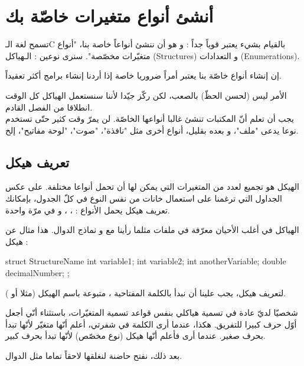 \chapter{أنشئ أنواع متغيرات خاصّة بك}

تسمح لغة الـ\textenglish{C}
بالقيام بشيء يعتبر قوياً جداً : و هو أن ننشئ أنواعاً خاصة بنا، "أنواع متغيّرات مخصّصة". سنرى نوعين : الـهياكل
(\textenglish{Structures})
و التعدادات
(\textenglish{Enumerations}).

 إن إنشاء أنواع خاصّة بنا يعتبر أمراً ضروريا خاصة إذا أردنا إنشاء برامج أكثر تعقيداً.

الأمر ليس  (لحسن الحظّ) بالصعب، لكن ركّز جيّدا لأننا سنستعمل الهياكل كل الوقت انطلاقا من الفصل القادم.\\
يجب أن تعلم أنّ المكتبات تنشئ غالبا أنواعها الخاصّة. لن يمرّ وقت كثير حتّى تستخدم نوعا يدعى "ملف"، و بعده بقليل، أنواع أخرى مثل "نافذة"، "صوت"، "لوحة مفاتيح"، إلخ.

\section{تعريف هيكل}

الهيكل هو تجميع لعدد من المتغيرات التي يمكن لها أن تحمل أنواعا مختلفة. على عكس الجداول التي ترغمنا على استعمال خانات من نفس النوع في كلّ الجدول، بإمكانك تعريف هيكل يحمل الأنواع :
، ، 
و
في مرّة واحدة.

الهياكل في أغلب الأحيان معرّفة في ملفات
مثلما رأينا مع
و نماذج الدوال. هذا مثال عن هيكل :

\begin{Csource}
struct StructureName
{
	int variable1;
	int variable2;
	int anotherVariable;
	double decimalNumber;
};
\end{Csource}

لتعريف هيكل، يجب علينا أن نبدأ بالكلمة المفتاحية
،
متبوعة باسم الهيكل (مثلا
أو
).

\begin{information}
  شخصيّا لديّ عادة في تسمية هياكلي بنفس قواعد تسمية المتغيّرات، باستثناء أنّي أجعل أوّل حرف كبيرا للتفريق. هكذا، عندما أرى الكلمة
في شفرتي، أعلم أنّها متغيّر لأنّها تبدأ بحرف صغير. عندما أرى
فأعلم أنّها هيكل (نوع مخصّص) لأنّها تبدأ بحرف كبير.
\end{information}

بعد ذلك، نفتح حاضنة لنغلقها لاحقاً تماما مثل الدوال.


